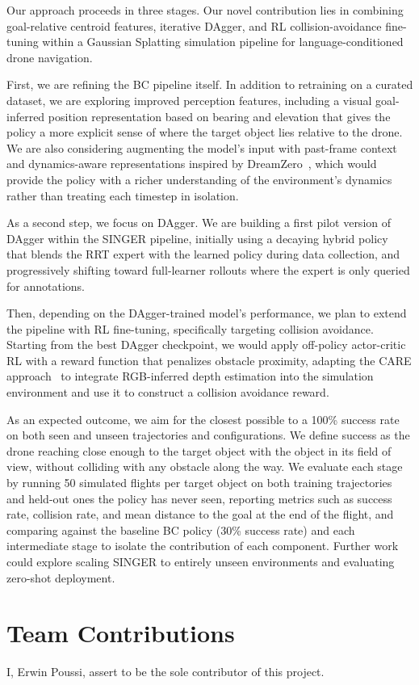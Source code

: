 \documentclass{article}
\begin{document}
Our approach proceeds in three stages. Our novel contribution lies in combining goal-relative centroid features, iterative DAgger, and RL collision-avoidance fine-tuning within a Gaussian Splatting simulation pipeline for language-conditioned drone navigation.

First, we are refining the BC pipeline itself. In addition to retraining on a curated dataset, we are exploring improved perception features, including a visual goal-inferred position representation based on bearing and elevation that gives the policy a more explicit sense of where the target object lies relative to the drone. We are also considering augmenting the model's input with past-frame context and dynamics-aware representations inspired by DreamZero~\citep{dreamzero2026}, which would provide the policy with a richer understanding of the environment's dynamics rather than treating each timestep in isolation.

As a second step, we focus on DAgger. We are building a first pilot version of DAgger within the SINGER pipeline, initially using a decaying hybrid policy~\citep{ross2011dagger} that blends the RRT expert with the learned policy during data collection, and progressively shifting toward full-learner rollouts where the expert is only queried for annotations.

Then, depending on the DAgger-trained model's performance, we plan to extend the pipeline with RL fine-tuning, specifically targeting collision avoidance. Starting from the best DAgger checkpoint, we would apply off-policy actor-critic RL with a reward function that penalizes obstacle proximity, adapting the CARE approach~\citep{care2025} to integrate RGB-inferred depth estimation into the simulation environment and use it to construct a collision avoidance reward.

As an expected outcome, we aim for the closest possible to a 100\% success rate on both seen and unseen trajectories and configurations. We define success as the drone reaching close enough to the target object with the object in its field of view, without colliding with any obstacle along the way. We evaluate each stage by running 50 simulated flights per target object on both training trajectories and held-out ones the policy has never seen, reporting metrics such as success rate, collision rate, and mean distance to the goal at the end of the flight, and comparing against the baseline BC policy (30\% success rate) and each intermediate stage to isolate the contribution of each component. Further work could explore scaling SINGER to entirely unseen environments and evaluating zero-shot deployment.

\section{Team Contributions} %

I, Erwin Poussi, assert to be the sole contributor of this project.



\end{document}

